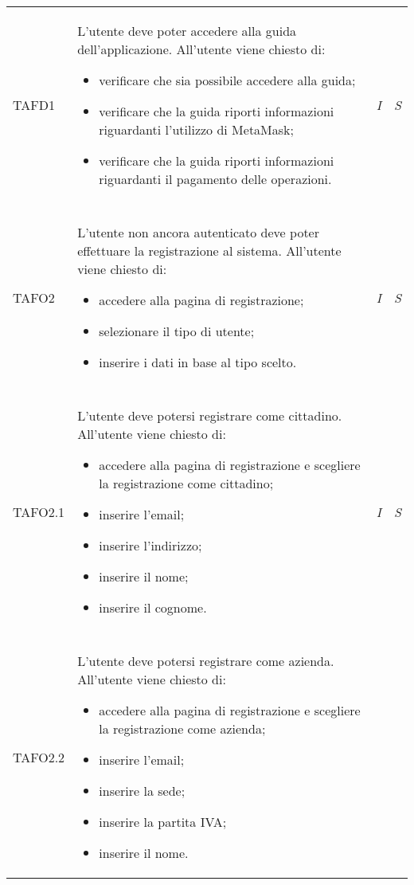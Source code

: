 \begin{longtable}{ >{\centering}p{} >{}p{}
			>{\centering}p{} >{\centering}p{}}
\hypertarget{TAFD1}{TAFD1} & L'utente deve poter accedere alla guida dell'applicazione. All'utente viene
		 chiesto di:
		 \begin{itemize}
		 	\item verificare che sia possibile accedere alla guida;
		 	\item verificare che la guida riporti informazioni riguardanti l'utilizzo di
		 	MetaMask\glo{};
		 	\item verificare che la guida riporti informazioni riguardanti il pagamento
		 	delle operazioni. 
		 \end{itemize} & \textit{I} & \textit{S}\\ \tabularnewline
\hypertarget{TAFO2}{TAFO2} & L'utente non ancora autenticato deve poter effettuare la registrazione al
		 sistema. All'utente viene chiesto di:
		 \begin{itemize}
		 	\item accedere alla pagina di registrazione;
		 	\item selezionare il tipo di utente;
		 	\item inserire i dati in base al tipo scelto.
		 \end{itemize} & \textit{I} & \textit{S}\\ \tabularnewline
\hypertarget{TAFO2.1}{TAFO2.1} & L'utente deve potersi registrare come cittadino. All'utente viene chiesto di:
		 \begin{itemize}
		 	\item accedere alla pagina di registrazione e scegliere la registrazione
		 	come cittadino;
		 	\item inserire l'email;
		 	\item inserire l'indirizzo;
		 	\item inserire il nome;
		 	\item inserire il cognome.
		 \end{itemize} & \textit{I} & \textit{S}\\ \tabularnewline
\hypertarget{TAFO2.2}{TAFO2.2} & L'utente deve potersi registrare come azienda. All'utente viene chiesto di:
		 \begin{itemize}
		 	\item accedere alla pagina di registrazione e scegliere la registrazione
		 	come azienda;
		 	\item inserire l'email;
		 	\item inserire la sede;
		 	\item inserire la partita IVA;
		 	\item inserire il nome.

\end{itemize}
\end{longtable}
